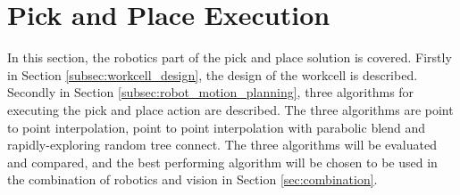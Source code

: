 \documentclass[../main.tex]{subfiles}
\begin{document}
\section{Pick and Place Execution} \label{sec:robotics}
In this section, the robotics part of the pick and place solution is covered. Firstly in Section \ref{subsec:workcell_design}, the design of the workcell is described. Secondly in Section \ref{subsec:robot_motion_planning}, three algorithms for executing the pick and place action are described. The three algorithms are point to point interpolation, point to point interpolation with parabolic blend and rapidly-exploring random tree connect. The three algorithms will be evaluated and compared, and the best performing algorithm will be chosen to be used in the combination of robotics and vision in Section \ref{sec:combination}. 
\end{document}
